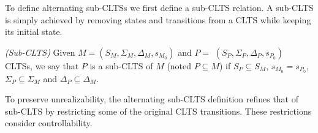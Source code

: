 

To define alternating sub-CLTSs we first define a sub-CLTS relation.  A sub-CLTS is simply achieved by removing states and transitions from a CLTS while keeping its initial state.

\begin{definition}\label{def:lts-inclusion}\emph{(Sub-CLTS)}
Given $M = (S_M, \Sigma_M, \Delta_M, s_{M_0})$ and
 $P =$ $(S_P,\Sigma_P,\Delta_P,s_{P_0})$ CLTSs, 
we say that $P$ is a sub-CLTS of $M$ (noted $P \subseteq M$) if $S_P \subseteq S_M$,
$s_{M_0} = s_{P_0}$, $\Sigma_P \subseteq \Sigma_M$ and $\Delta_P \subseteq \Delta_M$.
\end{definition}




To preserve unrealizability, the alternating sub-CLTS definition refines that of sub-CLTS by restricting some of the original CLTS transitions. 
These restrictions consider controllability. 



